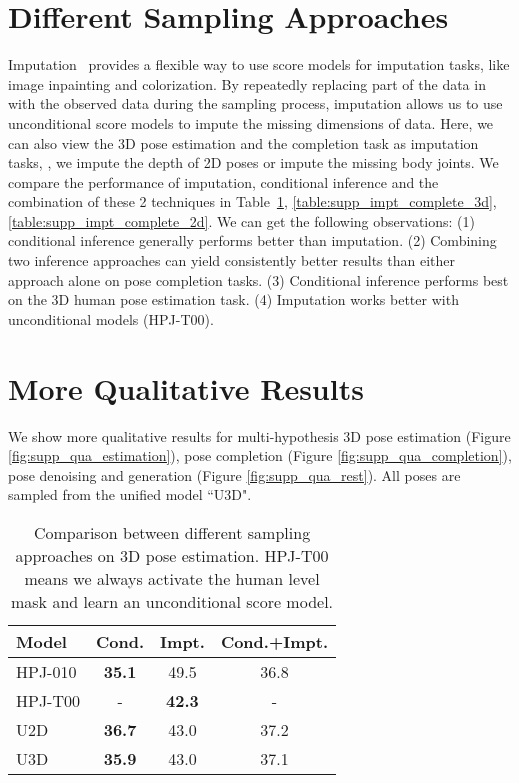\documentclass[10pt,twocolumn,letterpaper]{article}
\begin{document}
\section{Different Sampling Approaches}
\label{sec:supp_imputation}
Imputation~\cite{song2020score} provides a flexible way to use score models for imputation tasks, like image inpainting and colorization. By repeatedly replacing part of the data in  with the observed data  during the sampling process, imputation allows us to use unconditional score models to impute the missing dimensions of data. Here, we can also view the 3D pose estimation and the completion task as imputation tasks, \ie, we impute the depth of 2D poses or impute the missing body joints. We compare the performance of imputation, conditional inference and the combination of these 2 techniques in Table~\ref{table:supp_impt_hpe3d}, \ref{table:supp_impt_complete_3d}, \ref{table:supp_impt_complete_2d}. We can get the following observations: (1) conditional inference generally performs better than imputation. (2) Combining two inference approaches can yield consistently better results than either approach alone on pose completion tasks. (3) Conditional inference performs best on the 3D human pose estimation task. (4) Imputation works better with unconditional models (HPJ-T00).

\section{More Qualitative Results}
We show more qualitative results for multi-hypothesis 3D pose estimation (Figure \ref{fig:supp_qua_estimation}), pose completion (Figure \ref{fig:supp_qua_completion}), pose denoising and generation (Figure \ref{fig:supp_qua_rest}). All poses are sampled from the unified  model ``U3D". 







\begin{table}
    \centering
    \small
\begin{tabular}{l c c c}
            \toprule
            Model & Cond. & Impt. & Cond.+Impt. \\
            \midrule
            HPJ-010 &  \textbf{35.1} & 49.5 & 36.8 \\
            HPJ-T00 &  - & \textbf{42.3} & - \\
            U2D &  \textbf{36.7} & 43.0 & 37.2 \\
            U3D &  \textbf{35.9} & 43.0 & 37.1\\
            \bottomrule
        \end{tabular}
\caption{Comparison between different sampling approaches on 3D pose estimation. HPJ-T00 means we always activate the human level mask and learn an unconditional score model.}
    \label{table:supp_impt_hpe3d}
\end{table}
\end{document}
